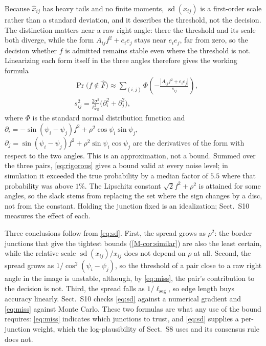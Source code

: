 Because $\hat x_{ij}$ has heavy tails and no finite moments, $\operatorname{sd}(x_{ij})$ is a first-order scale rather than a standard deviation, and it describes the threshold, not the decision. The distinction matters near a raw right angle: there the threshold and its scale both diverge, while the form $A_{ij}f^2+e_ie_j$ stays near $e_ie_j$, far from zero, so the decision whether $f$ is admitted remains stable even where the threshold is not. Linearizing each form itself in the three angles therefore gives the working formula
\begin{equation}
\begin{aligned}
&\Pr\bigl(f\notin\hat F\bigr)\approx\sum_{(i,j)}\Phi\!\left(-\frac{|A_{ij}f^2+e_ie_j|}{s_{ij}}\right),\\
&s_{ij}^2=\frac{2\sigma^2}{\ell_{\mathrm{seg}}^2}\bigl(\partial_i^2+\partial_j^2\bigr),
\end{aligned}
\label{eq:miss}
\end{equation}
where $\Phi$ is the standard normal distribution function and $\partial_i=-\sin(\psi_i-\psi_j)f^2+\rho^2\cos\psi_i\sin\psi_j$, $\partial_j=\sin(\psi_i-\psi_j)f^2+\rho^2\sin\psi_i\cos\psi_j$ are the derivatives of the form with respect to the two angles. This is an approximation, not a bound. Summed over the three pairs, \eqref{eq:rigorous} gives a bound valid at every noise level; in simulation it exceeded the true probability by a median factor of $5.5$ where that probability was above $1\%$. The Lipschitz constant $\sqrt2 f^2+\rho^2$ is attained for some angles, so the slack stems from replacing the set where the sign changes by a disc, not from the constant. Holding the junction fixed is an idealization; Sect.~S10 measures the effect of each.

Three conclusions follow from \eqref{eq:sd}. First, the spread grows as $\rho^2$: the border junctions that give the tightest bounds (\cref{M-cor:similar}) are also the least certain, while the relative scale $\operatorname{sd}(x_{ij})/x_{ij}$ does not depend on $\rho$ at all. Second, the spread grows as $1/\cos^2(\psi_i-\psi_j)$, so the threshold of a pair close to a raw right angle in the image is unstable, although, by \eqref{eq:miss}, the pair's contribution to the decision is not. Third, the spread falls as $1/\ell_{\mathrm{seg}}$, so edge length buys accuracy linearly. Sect.~S10 checks \eqref{eq:sd} against a numerical gradient and \eqref{eq:miss} against Monte Carlo. These two formulas are what any use of the bound requires: \eqref{eq:miss} indicates which junctions to trust, and \eqref{eq:sd} supplies a per-junction weight, which the log-plausibility of Sect.~S8 uses and its consensus rule does not.


